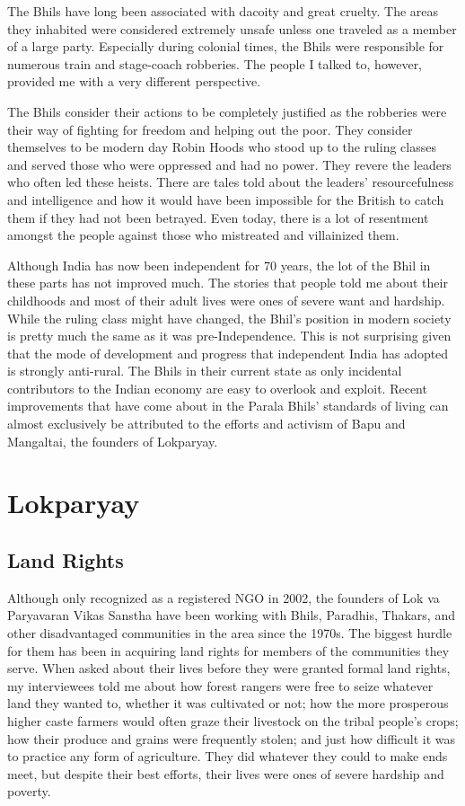 \documentclass[report.tex]{subfiles}
\begin{document}
The Bhils have long been associated with dacoity and great cruelty. The areas they inhabited were considered extremely unsafe unless one traveled as a member of a large party. Especially during colonial times, the Bhils were responsible for numerous train and stage-coach robberies. The people I talked to, however, provided me with a very different perspective.

The Bhils consider their actions to be completely justified as the robberies were their way of fighting for freedom and helping out the poor. They consider themselves to be modern day Robin Hoods who stood up to the ruling classes and served those who were oppressed and had no power. They revere the leaders who often led these heists. There are tales told about the leaders' resourcefulness and intelligence and how it would have been impossible for the British to catch them if they had not been betrayed. Even today, there is a lot of resentment amongst the people against those who mistreated and villainized them.

Although India has now been independent for 70 years, the lot of the Bhil in these parts has not improved much. The stories that people told me about their childhoods and most of their adult lives were ones of severe want and hardship. While the ruling class might have changed, the Bhil's position in modern society is pretty much the same as it was pre-Independence. This is not surprising given that the mode of development and progress that independent India has adopted is strongly anti-rural. The Bhils in their current state as only incidental contributors to the Indian economy are easy to overlook and exploit. Recent improvements that have come about in the Parala Bhils' standards of living can almost exclusively be attributed to the efforts and activism of Bapu and Mangaltai, the founders of Lokparyay.

\section{Lokparyay}\label{sec:lokparyay}

\subsection{Land Rights}\label{subsec:rights}
Although only recognized as a registered NGO in 2002, the founders of Lok va Paryavaran Vikas Sanstha have been working with Bhils, Paradhis, Thakars, and other disadvantaged communities in the area since the 1970s. The biggest hurdle for them has been in acquiring land rights for members of the communities they serve. When asked about their lives before they were granted formal land rights, my interviewees told me about how forest rangers were free to seize whatever land they wanted to, whether it was cultivated or not; how the more prosperous higher caste farmers would often graze their livestock on the tribal people's crops; how their produce and grains were frequently stolen; and just how difficult it was to practice any form of agriculture. They did whatever they could to make ends meet, but despite their best efforts, their lives were ones of severe hardship and poverty.
\end{document}
